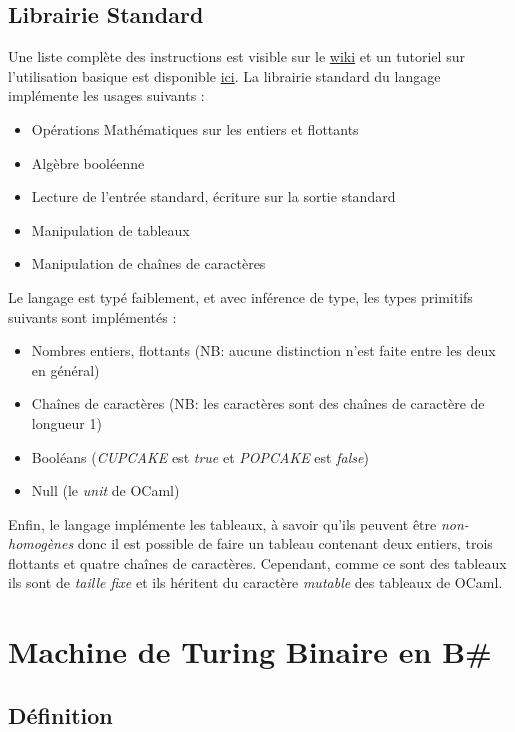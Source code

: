 \documentclass[11pt,colorlinks=true,a4paper]{article}
\newcommand{\bs}{B\# }
\begin{document}
    \subsection{Librairie Standard}
    Une liste complète des instructions est visible sur le \href{https://github.com/coco33920/ocaml-baguettesharp-interpreter/wiki}{wiki}
    et un tutoriel sur l'utilisation basique est disponible \href{https://www.baguettesharp.fr/basic.html}{ici}. La librairie 
    standard du langage implémente les usages suivants :
    \begin{itemize}
        \item Opérations Mathématiques sur les entiers et flottants 
        \item Algèbre booléenne
        \item Lecture de l'entrée standard, écriture sur la sortie standard
        \item Manipulation de tableaux 
        \item Manipulation de chaînes de caractères
    \end{itemize}
    \bigskip


    Le langage est typé faiblement, et avec inférence de type, les types primitifs suivants sont implémentés :
    \begin{itemize}
        \item Nombres entiers, flottants (NB: aucune distinction n'est faite entre les deux en général)
        \item Chaînes de caractères (NB: les caractères sont des chaînes de caractère de longueur 1)
        \item Booléans (\textit{CUPCAKE} est \textit{true} et \textit{POPCAKE} est \textit{false})
        \item Null (le \textit{unit} de OCaml)
    \end{itemize}
    \bigskip 

    Enfin, le langage implémente les tableaux, à savoir qu'ils peuvent être \textit{non-homogènes}
    donc il est possible de faire un tableau contenant deux entiers, trois flottants et quatre chaînes de caractères.
    Cependant, comme ce sont des tableaux ils sont de \textit{taille fixe} et ils héritent du caractère \textit{mutable}
    des tableaux de OCaml.
    \cleardoublepage
    \section{Machine de Turing Binaire en \bs}
    \subsection{Définition}
\end{document}
